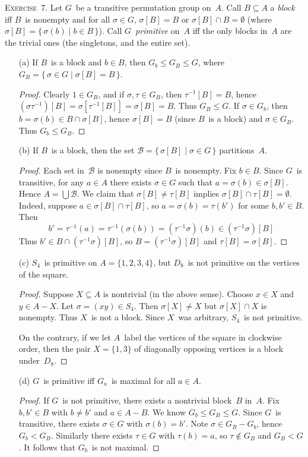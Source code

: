 \documentclass[letterpaper]{article}
\newcommand{\exercise}[1]{\goodbreak\noindent\textsc{Exercise~{#1}.}}
\newcommand{\B}{\mathcal{B}}
\newcommand{\bigunion}{\bigcup}
\newcommand{\sect}{\cap}
\newcommand{\subgroup}{\le}
\begin{document}
\exercise{7}
Let $G$~be a transitive permutation group on~$A$. Call $B\subseteq A$ a \emph{block} iff $B$~is nonempty and for all $\sigma\in G$, $\sigma[B]=B$ or $\sigma[B]\sect B=\emptyset$ (where $\sigma[B]=\{\,\sigma(b)\mid b\in B\,\}$). Call $G$~\emph{primitive} on~$A$ iff the only blocks in~$A$ are the trivial ones (the singletons, and the entire set).
\begin{enumerate}[itemsep=0pt]
\item[(a)] If $B$~is a block and $b\in B$, then $G_b\subgroup G_B\subgroup G$, where $G_B=\{\,\sigma\in G\mid \sigma[B]=B\,\}$.
\begin{proof}
Clearly $1\in G_B$, and if $\sigma,\tau\in G_B$, then $\tau^{-1}[B]=B$, hence $(\sigma\tau^{-1})[B]=\sigma[\tau^{-1}[B]]=\sigma[B]=B$. Thus $G_B\subgroup G$. If $\sigma\in G_b$, then $b=\sigma(b)\in B\sect\sigma[B]$, hence $\sigma[B]=B$ (since $B$~is a block) and $\sigma\in G_B$. Thus $G_b\subgroup G_B$.
\end{proof}
\item[(b)] If $B$~is a block, then the set $\B=\{\,\sigma[B]\mid\sigma\in G\,\}$ partitions~$A$.
\begin{proof}
Each set in~$\B$ is nonempty since $B$~is nonempty. Fix $b\in B$. Since $G$~is transitive, for any $a\in A$ there exists $\sigma\in G$ such that $a=\sigma(b)\in\sigma[B]$. Hence $A=\bigunion\B$. We claim that $\sigma[B]\ne\tau[B]$ implies $\sigma[B]\sect\tau[B]=\emptyset$. Indeed, suppose $a\in\sigma[B]\sect\tau[B]$, so $a=\sigma(b)=\tau(b')$ for some $b,b'\in B$. Then
$$b'=\tau^{-1}(a)=\tau^{-1}(\sigma(b))=(\tau^{-1}\sigma)(b)\in(\tau^{-1}\sigma)[B]$$
Thus $b'\in B\sect(\tau^{-1}\sigma)[B]$, so $B=(\tau^{-1}\sigma)[B]$ and $\tau[B]=\sigma[B]$.
\end{proof}
\item[(c)] $S_4$~is primitive on $A=\{1,2,3,4\}$, but $D_8$~is not primitive on the vertices of the square.
\begin{proof}
Suppose $X\subseteq A$ is nontrivial (in the above sense). Choose $x\in X$ and $y\in A-X$. Let $\sigma=(xy)\in S_4$. Then $\sigma[X]\ne X$ but $\sigma[X]\sect X$ is nonempty. Thus $X$~is not a block. Since $X$~was arbitrary, $S_4$~is not primitive.

On the contrary, if we let $A$~label the vertices of the square in clockwise order, then the pair $X=\{1,3\}$ of diagonally opposing vertices is a block under~$D_8$.
\end{proof}

\item[(d)] $G$~is primitive iff $G_a$~is maximal for all $a\in A$.
\begin{proof}
If $G$~is not primitive, there exists a nontrivial block~$B$ in~$A$. Fix $b,b'\in B$ with $b\ne b'$ and $a\in A-B$. We know $G_b\subgroup G_B\subgroup G$. Since $G$~is transitive, there exists $\sigma\in G$ with $\sigma(b)=b'$. Note $\sigma\in G_B-G_b$, hence $G_b<G_B$. Similarly there exists $\tau\in G$ with $\tau(b)=a$, so $\tau\not\in G_B$ and $G_B<G$. It follows that $G_b$~is not maximal.


\end{proof}
\end{enumerate}
\end{document}
